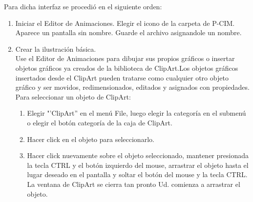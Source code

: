 Para dicha interfaz se procedió en el siguiente orden:
\begin{enumerate}
 \item Iniciar el Editor de Animaciones. Elegir el icono de la carpeta de P-CIM. Aparece un pantalla 
 sin nombre. Guarde el archivo asignandole un nombre.
 \item Crear la ilustración básica.\\
    Use el Editor de Animaciones para  dibujar sus propios gráficos 
    o insertar objetos gráficos ya creados de la biblioteca de ClipArt.Los objetos gráficos insertados 
    desde el ClipArt pueden tratarse como cualquier otro objeto gráfico y ser movidos, redimensionados, 
    editados y asignados con propiedades.
    Para seleccionar un objeto de ClipArt:
    \begin{enumerate}
      \item Elegir "’ClipArt” en el menú File, luego elegir la categoría en el submenú o elegir el botón 
      categoría de la caja de ClipArt.
      \item Hacer click en el objeto para seleccionarlo.
      \item Hacer click nuevamente sobre el objeto seleccionado, mantener presionada la tecla CTRL y 
      el botón izquierdo del mouse, arrastrar el objeto hasta el lugar deseado en el pantalla y soltar 
      el botón del mouse y la tecla CTRL. La ventana de ClipArt se cierra tan pronto Ud. comienza a 
      arrastrar el objeto.
    \end{enumerate}


\end{enumerate}
